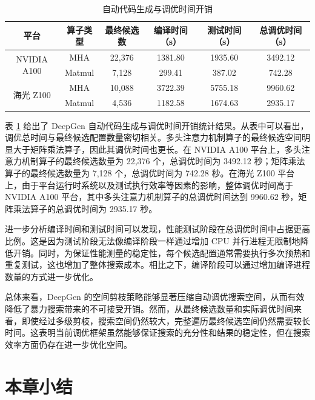 \begin{table}[htbp]
\caption{自动代码生成与调优时间开销}\label{tab:table_2}
\vspace{0.5em}\centering\wuhao
\renewcommand{\arraystretch}{1.35}
\begin{tabular}{cccccc}
\toprule[1.5pt]
平台 & 算子类型 & 最终候选数 & 编译时间（s） & 测试时间（s） & 总调优时间（s） \\ \midrule[1pt]
\multirow{2}{*}{NVIDIA A100} & MHA & 22,376 & 1381.80 & 1935.60 & 3492.12 \\
 & Matmul & 7,128 & 299.41 & 387.02 & 742.28 \\ 
\multirow{2}{*}{海光 Z100} & MHA & 10,088 & 3722.39 & 5755.18 & 9960.62 \\
 & Matmul & 4,536 & 1182.58 & 1674.63 & 2935.17 \\ \bottomrule[1.5pt]
\end{tabular}
\vspace{\baselineskip}
\end{table}

表 \ref{tab:table_2} 给出了 DeepGen 自动代码生成与调优时间开销统计结果。从表中可以看出，调优总时间与最终候选配置数量密切相关。多头注意力机制算子的最终候选空间明显大于矩阵乘法算子，因此其调优时间也更长。在 NVIDIA A100 平台上，多头注意力机制算子的最终候选数量为 22,376 个，总调优时间为 3492.12 秒；矩阵乘法算子的最终候选数量为 7,128 个，总调优时间为  742.28 秒。在海光 Z100 平台上，由于平台运行时系统以及测试执行效率等因素的影响，整体调优时间高于 NVIDIA A100 平台，其中多头注意力机制算子的总调优时间达到 9960.62 秒，矩阵乘法算子的总调优时间为 2935.17 秒。

进一步分析编译时间和测试时间可以发现，性能测试阶段在总调优时间中占据更高比例。这是因为测试阶段无法像编译阶段一样通过增加 CPU 并行进程无限制地降低开销。同时，为保证性能测量的稳定性，每个候选配置通常需要执行多次预热和重复测试，这也增加了整体搜索成本。相比之下，编译阶段可以通过增加编译进程数量的方式进一步优化。

总体来看，DeepGen 的空间剪枝策略能够显著压缩自动调优搜索空间，从而有效降低了暴力搜索带来的不可接受开销。然而，从最终候选数量和实际调优时间来看，即使经过多级剪枝，搜索空间仍然较大，完整遍历最终候选空间仍然需要较长时间。这表明当前调优框架虽然能够保证搜索的充分性和结果的稳定性，但在搜索效率方面仍存在进一步优化空间。



\section{本章小结}

